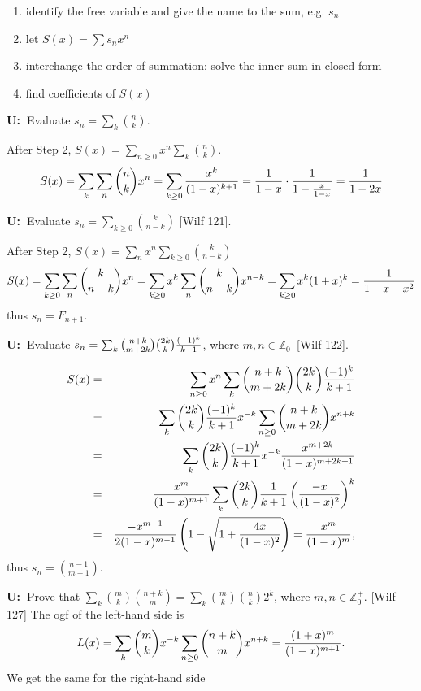 \documentclass[10pt, a4paper]{article}
\def\U{{\bf U:\ }}
\def\Z{\mathbb Z}
\begin{document}
\begin{enumerate}
    \item identify the free variable and give the name to the sum, e.g. $s_n$
    \item let $S(x) = \sum s_n x^n$
    \item interchange the order of summation; solve the inner sum in closed form
    \item find coefficients of $S(x)$
\end{enumerate}

\U Evaluate $s_n = \sum_k {n\choose k}$.

After Step 2, $S(x) = \sum_{n\ge 0} x^n \sum_k {n\choose k}$.
$$
    S(x) = \sum_k \sum_n {n\choose k}x^n = \sum_{k\ge 0} {x^k\over (1-x)^{k+1}}
        = {1\over 1-x}\cdot {1\over 1-{x\over 1-x}}={1\over 1-2x}
$$

\U Evaluate $s_n = \sum_{k\ge 0} {k\choose n-k}$ [Wilf 121].

After Step 2, $S(x) = \sum_n x^n \sum_{k\ge 0} {k\choose n-k}$
$$
    S(x) = \sum_{k\ge 0} \sum_n {k\choose n-k}x^n =
        \sum_{k\ge 0}x^k\sum_n {k\choose n-k}x^{n-k} = \sum_{k\ge 0}x^k (1+x)^k = {1\over 1-x-x^2}
$$
thus $s_n = F_{n+1}$.

\U Evaluate $s_n = \sum_{k} {n+k\choose m+2k}{2k\choose k}{(-1)^k\over k+1}$, where $m, n\in \Z_0^{+}$ [Wilf 122].

\begin{eqnarray*}
S(x) &=& \sum_{n\ge 0} x^n \sum_{k} {n+k\choose m+2k}{2k\choose k}{(-1)^k\over k+1} \\
        &=& \sum_k {2k\choose k}{(-1)^k\over k+1}x^{-k}\sum_{n\ge 0}{n+k\choose m+2k}x^{n+k}\\
        &=& \sum_k {2k\choose k}{(-1)^k\over k+1}x^{-k}{x^{m+2k}\over (1-x)^{m+2k+1}}\\
        &=& {x^m\over (1-x)^{m+1}}\sum_k {2k\choose k}{1\over k+1}\left({-x\over (1-x)^2}\right)^k \\
        &=& {-x^{m-1}\over 2(1-x)^{m-1}}\left(1-\sqrt{1+{4x\over (1-x)^2}}\right) = {x^m\over (1-x)^m},
\end{eqnarray*}
thus $s_n = {n-1\choose m-1}$.

\U Prove that $\sum_{k} {m\choose k}{n+k\choose m} = \sum_k {m\choose k}{n\choose k}2^k$, where $m, n\in \Z_0^{+}$. [Wilf 127]
The ogf of the left-hand side is
$$
    L(x) = \sum_{k} {m\choose k} x^{-k}\sum_{n\ge 0}{n+k\choose m}x^{n+k} ={(1+x)^m\over (1-x)^{m+1}}.
$$
We get the same for the right-hand side

\end{document}

